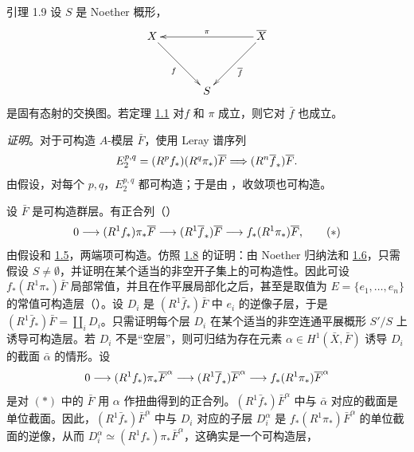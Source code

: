 \begin{enonce*}{引理 1.9}
设 $S$ 是 Noether 概形，
$$
\xymatrix@=1.25cm{
X       \ar[rd]_{f}      &      &\bar{X} \ar[ll]_{\pi} \ar[ld]^{\bar{f}}\\
              & S    &
}
$$
是固有态射的交换图。若定理 \hyperref[XIV.thm1.1]{1.1} 对\pageoriginale $f$ 和 $\pi$ 成立，则它对 $\bar{f}$ 也成立。
\end{enonce*}

\noindent
\emph{证明}。对于可构造 $A$-模层 $\bar{F}$，使用 Leray 谱序列
$$
E^{p,q}_2=(R^{p}f_{\ast})(R^{q}\pi_{\ast})\bar{F}\Longrightarrow
(R^{n}\bar{f}_{\ast})\bar{F}{\quoi}.
$$
由假设，对每个 $p,q$，$E^{p,q}_2$ 都可构造；于是由 ，收敛项也可构造。

设 $\bar{F}$ 是可构造群层。有正合列（）
\begin{equation*}
0\longrightarrow (R^{1}f_{\ast})\pi_{\ast}\bar{F}\longrightarrow
(R^{1}\bar{f}_{\ast})\bar{F}\longrightarrow
f_{\ast}(R^{1}\pi_{\ast})\bar{F}{\quoi},\tag{$\ast$}
\end{equation*}
由假设和 \hyperref[XIV.lem1.5]{1.5}，两端项可构造。仿照 \hyperref[XIV.lem1.8]{1.8} 的证明：由 Noether 归纳法和 \hyperref[XIV.lem1.6]{1.6}，只需假设 $S\neq ∅$，并证明在某个适当的非空开子集上的可构造性。因此可设 $f_{\ast}(R^{1}\pi_{\ast})\bar{F}$ 局部常值，并且在作平展局部化之后，甚至是取值为 $E=\{e_1,\ldots,e_n\}$ 的常值可构造层（）。设 $D_i$ 是 $(R^{1}\bar{f}_{\ast})\bar{F}$ 中 $e_i$ 的逆像子层，于是 $(R^{1}\bar{f}_{\ast})\bar{F}=\coprod_iD_i$。只需证明每个层 $D_i$ 在某个适当的非空连通平展概形 $S'/S$ 上诱导可构造层。若 $D_i$ 不是“空层”，则可归结为存在元素 $\alpha\in H^{1}(\bar{X},\bar{F})$ 诱导 $D_i$ 的截面 $\bar{\alpha}$ 的情形。设
$$
\sisi{
0\longrightarrow (R^{1}f_{\ast})\pi_{\ast}\bar{F}\longrightarrow
(R^{1}\bar{f}_{\ast})\bar{F}\longrightarrow
f_{\ast}(R^{1}\pi_{\ast})\bar{F}
}
{0\longrightarrow (R^{1}f_{\ast})\pi_{\ast}\bar{F}^{\alpha}\longrightarrow
(R^{1}\bar{f}_{\ast})\bar{F}^{\alpha}\longrightarrow
f_{\ast}(R^{1}\pi_{\ast})\bar{F}^{\alpha}}
$$
是对 $(\ast)$ 中的 $\bar{F}$ 用 $\alpha$ 作扭曲得到的正合列。$(R^{1}\bar{f}_{\ast})\bar{F}^{\alpha}$ 中与 $\bar{\alpha}$ 对应的截面是单位截面。因此，\hbox{$(R^{1}\bar{f}_{\ast})\bar{F}^{\alpha}$} 中与 $D_i$ 对应的子层 $D_i^{\alpha}$ 是 $f_{\ast}(R^{1}\pi_{\ast})\bar{F}^{\alpha}$ 的单位截面的逆像，\pageoriginale 从而 $D_i^{\alpha}\simeq (R^{1}f_{\ast})\pi_{\ast}\bar{F}^{\alpha}$，这确实是一个可构造层，\cqfd

